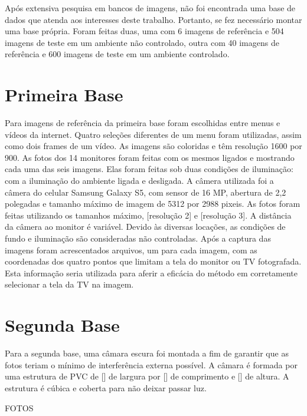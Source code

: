 Após extensiva pesquisa em bancos de imagens, não foi encontrada uma base de dados que atenda aos interesses deste trabalho. Portanto, se fez necessário montar uma base própria. Foram feitas duas, uma com 6 imagens de referência e 504 imagens de teste em um ambiente não controlado, outra com 40 imagens de referência e 600 imagens de teste em um ambiente controlado.

\section{Primeira Base}

Para imagens de referência da primeira base foram escolhidas entre menus e vídeos da internet. Quatro seleções diferentes de um menu foram utilizadas, assim como dois frames de um vídeo. As imagens são coloridas e têm resolução 1600 por 900. As fotos dos 14 monitores foram feitas com os mesmos ligados e mostrando cada uma das seis imagens. Elas foram feitas sob duas condições de iluminação: com a iluminação do ambiente ligada e desligada. A câmera utilizada foi a câmera do celular Samsung Galaxy S5, com sensor de 16 MP, abertura de 2,2 polegadas e tamanho máximo de imagem de 5312 por 2988 pixeis. As fotos foram feitas utilizando os tamanhos máximo, [resolução 2] e [resolução 3]. A distância da câmera ao monitor é variável. Devido às diversas locações, as condições de fundo e iluminação são consideradas não controladas. Após a captura das imagens foram acrescentados arquivos, um para cada imagem, com as coordenadas dos quatro pontos que limitam a tela do monitor ou TV fotografada. Esta informação seria utilizada para aferir a eficácia do método em corretamente selecionar a tela da TV na imagem.

\section{Segunda Base}

Para a segunda base, uma câmara escura foi montada a fim de garantir que as fotos teriam o mínimo de interferência externa possível. A câmara é formada por uma estrutura de PVC de [] de largura por [] de comprimento e [] de altura. A estrutura é cúbica e coberta para não deixar passar luz. 

FOTOS








